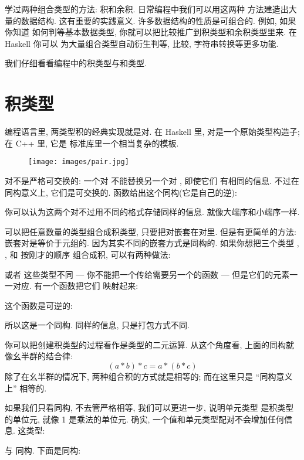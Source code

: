
\lettrine[lhang=0.17]{学}{过两种}组合类型的方法: 积和余积. 日常编程中我们可以用这两种
方法建造出大量的数据结构. 这有重要的实践意义. 许多数据结构的性质是可组合的. 例如, 如果你知道
如何判等基本数据类型, 你就可以把比较推广到积类型和余积类型里来. 在 Haskell 你可以
为大量组合类型自动衍生判等, 比较, 字符串转换等更多功能.

我们仔细看看编程中的积类型与和类型.

\section{积类型}

编程语言里, 两类型积的经典实现就是对. 在 Haskell 里, 对是一个原始类型构造子; 在 C++ 里, 它是
标准库里一个相当复杂的模板.

\begin{figure}[H]
  \centering
  \texttt{[image: images/pair.jpg]}
\end{figure}

\noindent
对不是严格可交换的: 一个对  不能替换另一个对 , 即使它们
有相同的信息. 不过在同构意义上, 它们是可交换的.  函数给出这个同构(它是自己的逆):

你可以认为这两个对不过用不同的格式存储同样的信息. 就像大端序和小端序一样.

可以把任意数量的类型组合成积类型, 只要把对嵌套在对里. 但是有更简单的方法: 嵌套对是等价于元组的.
因为其实不同的嵌套方式是同构的. 如果你想把三个类型 , , 和  按刚才的顺序
组合成积, 可以有两种做法:


或者
这些类型不同 --- 你不能把一个传给需要另一个的函数 --- 但是它们的元素一一对应. 有一个函数把它们
映射起来:

这个函数是可逆的:

所以这是一个同构. 同样的信息, 只是打包方式不同.

你可以把创建积类型的过程看作是类型的二元运算. 从这个角度看, 上面的同构就像幺半群的结合律:
\[(a * b) * c = a * (b * c)\]
除了在幺半群的情况下, 两种组合积的方式就是相等的; 而在这里只是 ``同构意义上'' 相等的.

如果我们只看同构, 不去管严格相等, 我们可以更进一步, 说明单元类型 \code{()} 是积类型的单位元,
就像 1 是乘法的单位元. 确实, 一个值和单元类型配对不会增加任何信息. 这类型:

与  同构. 下面是同构:

